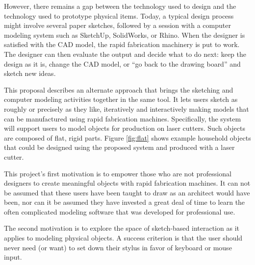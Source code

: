\documentclass[12pt]{article}
\begin{document}
However, there remains a gap between the technology used to design and
the technology used to prototype physical items. Today, a typical
design process might involve several paper sketches, followed by a
session with a computer modeling system such as SketchUp, SolidWorks,
or Rhino. When the designer is satisfied with the CAD model, the rapid
fabrication machinery is put to work. The designer can then evaluate
the output and decide what to do next: keep the design as it is,
change the CAD model, or ``go back to the drawing board'' and sketch
new ideas.

This proposal describes an alternate approach that brings the
sketching and computer modeling activities together in the same
tool. It lets users sketch as roughly or precisely as they like,
iteratively and interactively making models that can be manufactured
using rapid fabrication machines. Specifically, the system will
support users to model objects for production on laser cutters. Such
objects are composed of flat, rigid parts. Figure \ref{fig:flat} shows
example household objects that could be designed using the proposed
system and produced with a laser cutter.

This project's first motivation is to empower those who are not
professional designers to create meaningful objects with rapid
fabrication machines. It can not be assumed that these users have been
taught to draw as an architect would have been, nor can it be assumed
they have invested a great deal of time to learn the often complicated
modeling software that was developed for professional use. 

The second motivation is to explore the space of sketch-based
interaction as it applies to modeling physical objects. A success
criterion is that the user should never need (or want) to set down
their stylus in favor of keyboard or mouse input.


\end{document}
